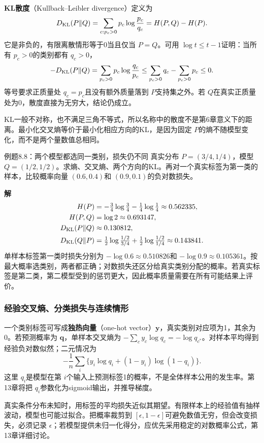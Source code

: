 \documentclass[UTF8,fontset=none,zihao=-4,a4paper]{ctexart}
\newcommand{\term}[1]{\textbf{#1}}
\newcommand{\sol}{\par\noindent\textbf{解}\quad}
\numberwithin{equation}{section}
\numberwithin{figure}{section}
\begin{document}
\term{KL散度}（Kullback--Leibler divergence）定义为
\[
 D_{\rm KL}(P\|Q)=\sum_{c:p_c>0}p_c\log\frac{p_c}{q_c}
 =H(P,Q)-H(P).
\]
它是非负的，有限离散情形等于0当且仅当 $P=Q$。可用 $\log t\le t-1$证明：当所有 $p_c>0$的类别都有 $q_c>0$，
\[
 -D_{\rm KL}(P\|Q)
 =\sum_{p_c>0}p_c\log\frac{q_c}{p_c}
 \le\sum_{p_c>0}q_c-\sum_{p_c>0}p_c\le0.
\]
等号要求正质量处 $q_c=p_c$且没有额外质量落到 $P$支持集之外。若 $Q$在真实正质量处为0，散度直接为无穷大，结论仍成立。

KL一般不对称，也不满足三角不等式，所以名称中的散度不是第6章意义下的距离。最小化交叉熵等价于最小化相应方向的KL，是因为固定 $P$的熵不随模型变化，而不是两个量数值总相同。

\begin{infobox}{例题8.8：两个模型都选同一类别，损失仍不同}
真实分布 $P=(3/4,1/4)$，模型 $Q=(1/2,1/2)$。求熵、交叉熵、两个方向的KL。再对一个真实标签为第一类的样本，比较概率向量 $(0.6,0.4)$和 $(0.9,0.1)$的负对数损失。
\end{infobox}
\sol
\begin{align*}
 H(P)&=-\tfrac34\log\tfrac34-\tfrac14\log\tfrac14\approx0.562335,\\
 H(P,Q)&=\log2\approx0.693147,\\
 D_{\rm KL}(P\|Q)&\approx0.130812,\\
 D_{\rm KL}(Q\|P)&=\tfrac12\log\tfrac{1/2}{3/4}+\tfrac12\log\tfrac{1/2}{1/4}
 \approx0.143841.
\end{align*}
单样本标签第一类时损失分别为 $-\log0.6\approx0.510826$和 $-\log0.9\approx0.105361$。按最大概率选类别，两者都正确；对数损失还区分给真实类别分配的概率。若真实标签是第二类，第二模型受到的惩罚更大，因此概率质量需要在所有可能结果上评价。

\subsubsection{经验交叉熵、分类损失与连续情形}
一个类别标签可写成\term{独热向量}（one-hot vector）$\symbf y$，真实类别对应项为1，其余为0。若预测概率为 $\symbf q$，单样本交叉熵为 $-\sum_cy_c\log q_c=-\log q_{c^*}$。对样本平均得到经验负对数似然；二元情况为
\[
 -\frac1n\sum_i\{y_i\log q_i+(1-y_i)\log(1-q_i)\}.
\]
这里 $q_i$是模型在第 $i$个输入上预测标签1的概率，不是全体样本公用的发生率。第13章将把 $q_i$参数化为sigmoid输出，并推导梯度。

真实条件分布未知时，用标签的平均损失近似其期望。有限样本上的经验值有抽样波动，模型也可能过拟合。把概率裁剪到 $[\epsilon,1-\epsilon]$可避免数值无穷，但会改变损失，必须记录 $\epsilon$；若模型提供未归一化得分，应优先采用稳定的对数概率公式，第13章详细讨论。
\end{document}
